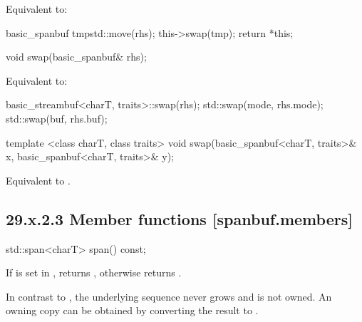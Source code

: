 \documentclass[ebook,11pt,article]{memoir}
\begin{document}
\begin{itemdescr}
\pnum
\effects Equivalent to:
\begin{codeblock}
    basic_spanbuf tmp{std::move(rhs)};
    this->swap(tmp);
    return *this;
\end{codeblock}
\end{itemdescr}

\begin{itemdecl}
void swap(basic_spanbuf& rhs);
\end{itemdecl}

\begin{itemdescr}
\pnum
\effects Equivalent to:
\begin{codeblock} 
    basic_streambuf<charT, traits>::swap(rhs);
    std::swap(mode, rhs.mode);
    std::swap(buf, rhs.buf);
\end{codeblock}
\end{itemdescr}

\begin{itemdecl}
template <class charT, class traits>
  void swap(basic_spanbuf<charT, traits>& x,
            basic_spanbuf<charT, traits>& y);
\end{itemdecl}

\begin{itemdescr}
\pnum
\effects Equivalent to .
\end{itemdescr}


\subsection{29.x.2.3 Member functions [spanbuf.members]}

\begin{itemdecl}
std::span<charT> span() const;
\end{itemdecl}

\begin{itemdescr}
\pnum
\returns
If  is set in ,
returns , 
otherwise returns . 

\begin{note}
In contrast to , the underlying sequence never grows and is not owned. 
An owning copy can be obtained by converting the result to .
\end{note}


\end{itemdescr}
\end{document}
